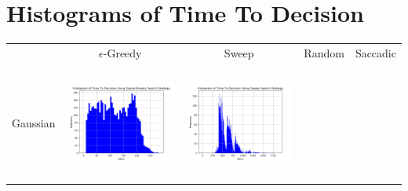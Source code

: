 
\chapter{Histograms of Time To Decision}



\begin{landscape}
\centering
\vspace*{\fill}
\begin{table}[h!]
  \centering
  \begin{tabular}{ | c | c | c | c | c |}
    \hline
    & $\epsilon$-Greedy & Sweep & Random & Saccadic \\
    Gaussian & \vline
    \begin{minipage}[c][36mm][c]{38mm}
      \includegraphics[width=38mm, height=38mm]{Chapters/MultiAgentTargetDetection/Figs/Results/Prior/Gaussian/SingleAgentSingleSourceGaussianEpsilonGreedyHistogram.png}
    \end{minipage}
    &
    \begin{minipage}[c][36mm][c]{38mm}
      \includegraphics[width=38mm, height=38mm]{Chapters/MultiAgentTargetDetection/Figs/Results/Prior/Gaussian/SingleAgentSingleSourceGaussianSweepHistogram.png}


\end{minipage}
\end{tabular}
\end{table}
\end{landscape}
